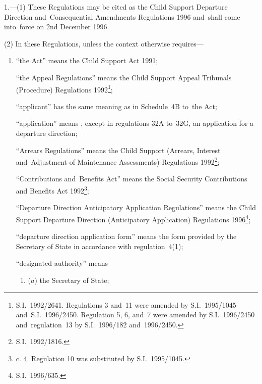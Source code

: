 \documentclass[12pt,a4paper]{article}
\begin{document}
\renewcommand\parthead{--- Part~I}

1.—(1) These Regulations
may be cited as the Child Support Departure Direction and~Consequential
Amendments Regulations 1996 and~shall come into~force on 2nd December 1996.

(2) In these Regulations, unless the context otherwise requires—
\begin{enumerate}\item[]
“the Act” means the Child Support Act 1991;

“the Appeal Regulations” means the Child Support Appeal Tribunals (Procedure)
Regulations 1992\footnote{\frenchspacing S.I.~1992/2641. Regulations 3 and~11 were amended by S.I.~1995/1045 and~S.I.~1996/2450. Regulation 5, 6, and~7 were amended by S.I.~1996/2450 and~regulation~13 by S.I.~1996/182 and~1996/2450.};

“applicant” has the same meaning as in Schedule~4B to~the Act;

“application” means%
, except in regulations 32A to~32G,  %
an application for a departure direction;

“Arrears Regulations” means the Child Support (Arrears, Interest and~Adjustment
of Maintenance Assessments) Regulations 1992\footnote{\frenchspacing S.I.~1992/1816.};


“Contributions and~Benefits Act” means the Social Security Contributions and
Benefits Act 1992\footnote{ c. 4. Regulation 10 was substituted by S.I.~1995/1045.};

“Departure Direction Anticipatory Application Regulations” means the Child
Support Departure Direction (Anticipatory Application) Regulations 1996\footnote{\frenchspacing S.I.~1996/635.};

“departure direction application form” means the form provided by the Secretary
of State in accordance with regulation~4(1);


“designated authority” means—
\begin{enumerate}\item[]
    ($a$) 
    the Secretary of State;


\end{enumerate}
\end{enumerate}
\end{document}
